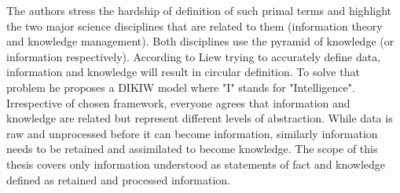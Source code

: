 The authors stress the hardship of definition of such primal terms and highlight the two major science disciplines that are related to them (information theory and knowledge management).
Both disciplines use the pyramid of knowledge (or information respectively).
According to Liew\cite{liew2013dikiw} trying to accurately define data, information and knowledge will result in circular definition.
To solve that problem he proposes a DIKIW model where "I" stands for "Intelligence".
Irrespective of chosen framework, everyone agrees that information and knowledge are related but represent different levels of abstraction.
While data is raw and unprocessed before it can become information, similarly information needs to be retained and assimilated to become knowledge.
The scope of this thesis covers only information understood as statements of fact and knowledge defined as retained and processed information.

